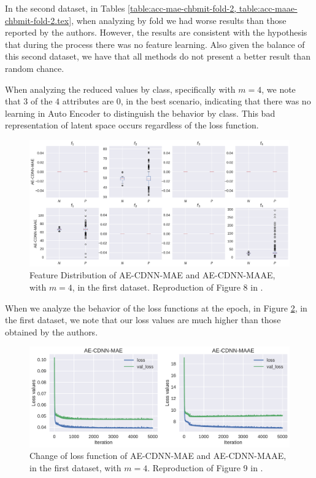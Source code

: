 In the second dataset, in Tables \ref{table:acc-mae-chbmit-fold-2, table:acc-maae-chbmit-fold-2.tex}, when analyzing by fold we had worse results than those reported by the authors. However, the results are consistent with the hypothesis that during the process there was no feature learning. Also given the balance of this second dataset, we have that all methods do not present a better result than random chance.





When analyzing the reduced values by class, specifically with $m = 4$, we note that $3$ of the $4$ attributes are $0$, in the best scenario, indicating that there was no learning in Auto Encoder to distinguish the behavior by class. This bad representation of latent space occurs regardless of the loss function.


\begin{figure}[!ht]
\centering
\includegraphics[width=0.8\linewidth]{figure/feature_distribution_4.pdf}
  \caption{Feature Distribution of AE-CDNN-MAE and AE-CDNN-MAAE, with $m=4$, in the first dataset. Reproduction of Figure 8 in \cite{WenZha:2018}.  }
\label{fig:feature_distribution_4}
\end{figure}


When we analyze the behavior of the loss functions at the epoch, in Figure \ref{fig:change_loss_mae_maae}, in the first dataset, we note that our loss values are much higher than those obtained by the authors. 


\begin{figure}[!ht]
\centering
\includegraphics[width=0.8\linewidth]{figure/change_loss_mae_maae.pdf}
  \caption{Change of loss function of AE-CDNN-MAE and AE-CDNN-MAAE, in the first dataset, with $m=4$. Reproduction of Figure 9 in \cite{WenZha:2018}. }
\label{fig:change_loss_mae_maae}
\end{figure}


